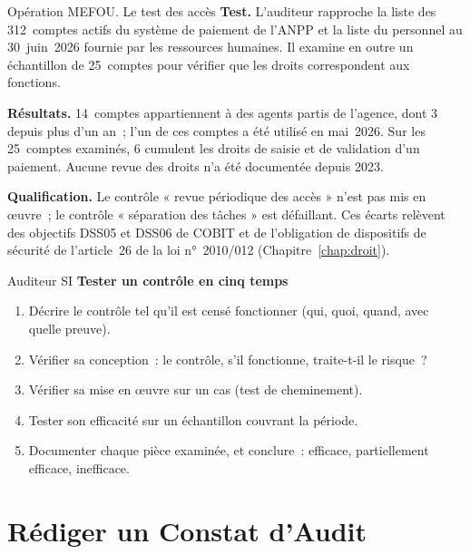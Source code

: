 \begin{boxscenario}{Opération MEFOU. Le test des accès}
\textbf{Test.} L'auditeur rapproche la liste des 312~comptes actifs du
système de paiement de l'ANPP et la liste du personnel au 30~juin~2026
fournie par les ressources humaines. Il examine en outre un échantillon de
25~comptes pour vérifier que les droits correspondent aux fonctions.

\medskip
\textbf{Résultats.} 14~comptes appartiennent à des agents partis de
l'agence, dont 3 depuis plus d'un an~; l'un de ces comptes a été utilisé
en mai~2026. Sur les 25~comptes examinés, 6 cumulent les droits de saisie
et de validation d'un paiement. Aucune revue des droits n'a été
documentée depuis 2023.

\medskip
\textbf{Qualification.} Le contrôle « revue périodique des accès » n'est
pas mis en œuvre~; le contrôle « séparation des tâches » est défaillant.
Ces écarts relèvent des objectifs DSS05 et DSS06 de COBIT et de
l'obligation de dispositifs de sécurité de l'article~26 de la loi
n°~2010/012 (Chapitre~\ref{chap:droit}).
\end{boxscenario}

\begin{boxmetier}{Auditeur SI}
\textbf{Tester un contrôle en cinq temps}
\begin{enumerate}
    \item Décrire le contrôle tel qu'il est censé fonctionner (qui, quoi,
          quand, avec quelle preuve).
    \item Vérifier sa conception~: le contrôle, s'il fonctionne, traite-t-il
          le risque~?
    \item Vérifier sa mise en œuvre sur un cas (test de cheminement).
    \item Tester son efficacité sur un échantillon couvrant la période.
    \item Documenter chaque pièce examinée, et conclure~: efficace,
          partiellement efficace, inefficace.
\end{enumerate}
\end{boxmetier}

\section{Rédiger un Constat d'Audit}
\label{sec:c11-constat}

